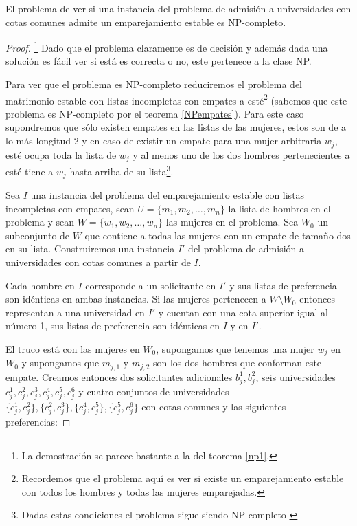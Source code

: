 \begin{teo} \cite{Todo}
El problema de ver si una instancia del problema de admisión a universidades con cotas comunes admite un emparejamiento estable es NP-completo. 
\end{teo}
\begin{proof}
\footnote{La demostración se parece bastante a la del teorema \ref{np1}.}
Dado que el problema claramente es de decisión y además dada una solución es fácil ver si está es correcta o no, este pertenece a la clase NP.

Para ver que el problema es NP-completo reduciremos el problema del matrimonio estable con listas incompletas con empates a esté\footnote{Recordemos que el problema aquí es ver si existe un emparejamiento estable con todos los hombres y todas las mujeres emparejadas.} (sabemos que este problema es NP-completo por el teorema \ref{NPempates}). Para este caso supondremos que sólo existen empates en las listas de las mujeres, estos son de a lo más longitud 2 y en caso de existir un empate para una mujer arbitraria $w_j$, esté ocupa toda la lista de $w_j$ y al menos uno de los dos hombres pertenecientes a esté tiene a $w_j$ hasta arriba de su lista\footnote{Dadas estas condiciones el problema sigue siendo NP-completo \cite{empates}}. 

Sea $I$ una instancia del problema del emparejamiento estable con listas incompletas con empates, sean $U=\{m_1,m_2,\dots,m_n\}$ la lista de hombres en el problema y sean $W=\{w_1,w_2,\dots,w_n\}$ las mujeres en el problema. Sea $W_0$ un subconjunto de $W$ que contiene a todas las mujeres con un empate de tamaño dos en su lista. Construiremos una instancia $I'$ del problema de admisión a universidades con cotas comunes a partir de $I$. 

Cada hombre en $I$ corresponde a un solicitante en $I'$ y sus listas de preferencia son idénticas en ambas instancias. Si las mujeres pertenecen a $W \setminus W_0$ entonces representan a una universidad en $I'$ y cuentan con una cota superior igual al número 1, sus listas de preferencia son idénticas en $I$ y en $I'$. 

El truco está con las mujeres en $W_0$, supongamos que tenemos una mujer $w_j$ en $W_0$ y supongamos que $m_{j,1}$ y $m_{j,2}$ son los dos hombres que conforman este empate. Creamos entonces dos solicitantes adicionales $b_j^1,b_j^2$, seis universidades $c_j^1,c_j^2,c_j^3,c_j^4,c_j^5,c_j^6$ y cuatro conjuntos de universidades $\{c_j^1,c_j^2\},\{c_j^2,c_j^3\},\{c_j^4,c_j^5\},\{c_j^5,c_j^6\}$ con cotas comunes y las siguientes preferencias: 


\end{proof}
